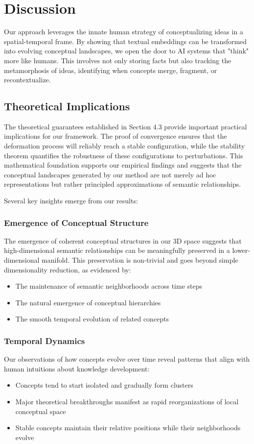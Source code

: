 \documentclass{article}
\begin{document}
\section{Discussion}
Our approach leverages the innate human strategy of conceptualizing ideas in a spatial-temporal frame. By showing that textual embeddings can be transformed into evolving conceptual landscapes, we open the door to AI systems that "think" more like humans. This involves not only storing facts but also tracking the metamorphosis of ideas, identifying when concepts merge, fragment, or recontextualize.

\subsection{Theoretical Implications}
The theoretical guarantees established in Section 4.3 provide important practical implications for our framework. The proof of convergence ensures that the deformation process will reliably reach a stable configuration, while the stability theorem quantifies the robustness of these configurations to perturbations. This mathematical foundation supports our empirical findings and suggests that the conceptual landscapes generated by our method are not merely ad hoc representations but rather principled approximations of semantic relationships.

Several key insights emerge from our results:

\subsubsection{Emergence of Conceptual Structure}
The emergence of coherent conceptual structures in our 3D space suggests that high-dimensional semantic relationships can be meaningfully preserved in a lower-dimensional manifold. This preservation is non-trivial and goes beyond simple dimensionality reduction, as evidenced by:
\begin{itemize}
    \item The maintenance of semantic neighborhoods across time steps
    \item The natural emergence of conceptual hierarchies
    \item The smooth temporal evolution of related concepts
\end{itemize}

\subsubsection{Temporal Dynamics}
Our observations of how concepts evolve over time reveal patterns that align with human intuitions about knowledge development:
\begin{itemize}
    \item Concepts tend to start isolated and gradually form clusters
    \item Major theoretical breakthroughs manifest as rapid reorganizations of local conceptual space
    \item Stable concepts maintain their relative positions while their neighborhoods evolve
\end{itemize}
\end{document}
